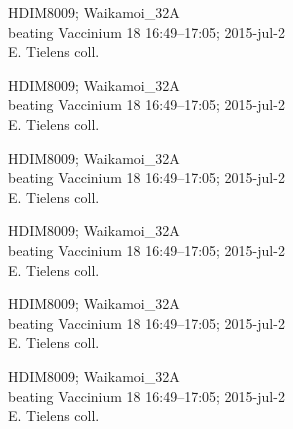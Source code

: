 \documentclass[2pt]{extarticle}
\begin{document}
\noindent
\parbox{0.16\textwidth}{\tiny \raggedright \rule[-0.3\baselineskip]{0pt}{10pt}HDIM8009; Waikamoi\_32A\\ beating Vaccinium 18 16:49--17:05; 2015-jul-2\\ E. Tielens coll.}
\parbox{0.16\textwidth}{\tiny \raggedright \rule[-0.3\baselineskip]{0pt}{10pt}HDIM8009; Waikamoi\_32A\\ beating Vaccinium 18 16:49--17:05; 2015-jul-2\\ E. Tielens coll.}
\parbox{0.16\textwidth}{\tiny \raggedright \rule[-0.3\baselineskip]{0pt}{10pt}HDIM8009; Waikamoi\_32A\\ beating Vaccinium 18 16:49--17:05; 2015-jul-2\\ E. Tielens coll.}
\parbox{0.16\textwidth}{\tiny \raggedright \rule[-0.3\baselineskip]{0pt}{10pt}HDIM8009; Waikamoi\_32A\\ beating Vaccinium 18 16:49--17:05; 2015-jul-2\\ E. Tielens coll.}
\parbox{0.16\textwidth}{\tiny \raggedright \rule[-0.3\baselineskip]{0pt}{10pt}HDIM8009; Waikamoi\_32A\\ beating Vaccinium 18 16:49--17:05; 2015-jul-2\\ E. Tielens coll.}
\parbox{0.16\textwidth}{\tiny \raggedright \rule[-0.3\baselineskip]{0pt}{10pt}HDIM8009; Waikamoi\_32A\\ beating Vaccinium 18 16:49--17:05; 2015-jul-2\\ E. Tielens coll.}
\end{document}
